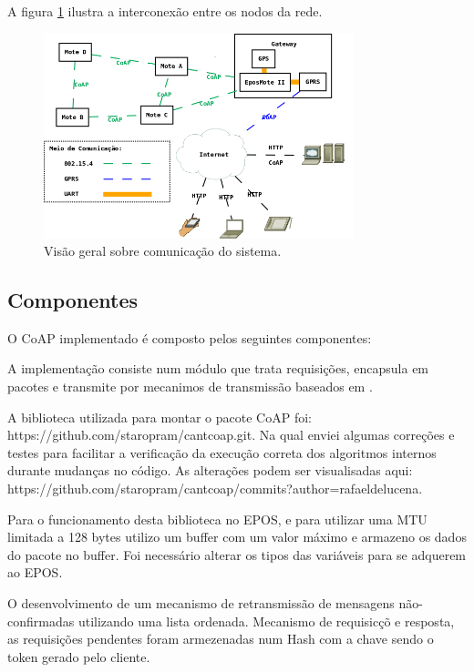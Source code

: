 A figura \ref{arquitetura} ilustra a interconex\~ao entre os nodos da rede.

\begin{figure}[h]
   \label{arquitetura}
   \centering
   \includegraphics[width=0.8\textwidth]{figuras/arquitetura.png}
   \caption{Vis\~ao geral sobre comunica\c{c}\~ao do sistema.}
\end{figure}

\subsection{Componentes}
O CoAP implementado \'e composto pelos seguintes componentes:



A implementa\c{c}\~ao consiste num m\'odulo que trata requisi\c{c}\~oes, encapsula em pacotes e transmite por mecanimos de transmiss\~ao baseados em \cite{draft-ietf-core-coap-18}.

A biblioteca utilizada para montar o pacote CoAP foi:\\https://github.com/staropram/cantcoap.git. Na qual enviei algumas corre\c{c}\~oes e testes para facilitar a verifica\c{c}\~ao da execu\c{c}\~ao correta dos algoritmos internos durante mudan\c{c}as no c\'odigo. As altera\c{c}\~oes podem ser visualisadas aqui:\\https://github.com/staropram/cantcoap/commits?author=rafaeldelucena.

Para o funcionamento desta biblioteca no EPOS, e para utilizar uma MTU limitada a 128 bytes utilizo um buffer com um valor m\'aximo e armazeno os dados do pacote no buffer. Foi necess\'ario alterar os tipos das vari\'aveis para se adquerem ao EPOS.

O desenvolvimento de um mecanismo de retransmiss\~ao de mensagens n\~ao-confirmadas utilizando uma lista ordenada. Mecanismo de requisic\c{c}\~o e resposta, as requisi\c{c}\~oes pendentes foram armezenadas num Hash com a chave sendo o token gerado pelo cliente.

